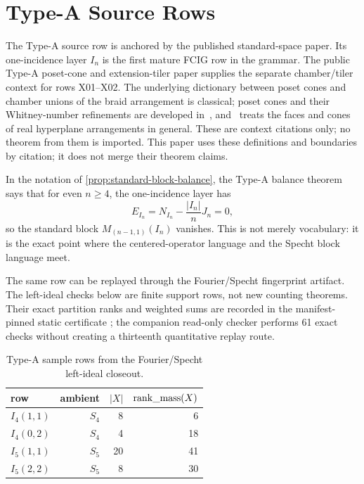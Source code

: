 \section{Type-A Source Rows}

The Type-A source row is anchored by the published standard-space paper\cite{BabanskyyTypeAFCIG2026}.  Its one-incidence layer \(I_n\) is the first mature FCIG row in the grammar.  The public Type-A poset-cone and extension-tiler paper supplies the separate chamber/tiler context for rows X01--X02\cite{BabanskyyTypeAPoset2026}.  The underlying dictionary between poset cones and chamber unions of the braid arrangement is classical; poset cones and their Whitney-number refinements are developed in~\cite{DorpalenBarryKimReiner2021}, and~\cite{AguiarMahajan2017} treats the faces and cones of real hyperplane arrangements in general.  These are context citations only; no theorem from them is imported.  This paper uses these definitions and boundaries by citation; it does not merge their theorem claims.

In the notation of \cref{prop:standard-block-balance}, the Type-A balance theorem says that for even \(n\geq 4\), the one-incidence layer has
\[
  E_{I_n}=N_{I_n}-\frac{|I_n|}{n}J_n=0,
\]
so the standard block \(M_{(n-1,1)}(I_n)\) vanishes.  This is not merely vocabulary: it is the exact point where the centered-operator language and the Specht block language meet.

The same row can be replayed through the Fourier/Specht fingerprint artifact.
The left-ideal checks below are finite support rows, not new counting theorems.
Their exact partition ranks and weighted sums are recorded in the
manifest-pinned static certificate
; the companion
read-only checker performs 61 exact checks without creating a thirteenth
quantitative replay route.

\begin{table}[ht]
\centering
\caption{Type-A sample rows from the Fourier/Specht left-ideal closeout.}
\label{tab:type-a-rankmass}
\begin{tabular}{@{}lrrr@{}}
\toprule
row & ambient & \(|X|\) & \(\operatorname{rank\_mass}(X)\) \\
\midrule
\(I_4(1,1)\) & \(S_4\) & 8 & 6 \\
\(I_4(0,2)\) & \(S_4\) & 4 & 18 \\
\(I_5(1,1)\) & \(S_5\) & 20 & 41 \\
\(I_5(2,2)\) & \(S_5\) & 8 & 30 \\
\bottomrule
\end{tabular}
\end{table}

